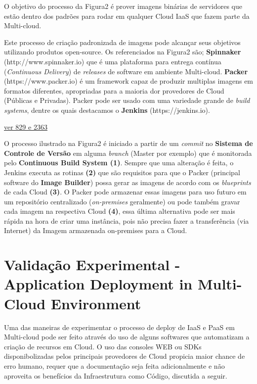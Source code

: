 \documentclass[12pt]{article}
\begin{document}
	O objetivo do processo da Figura2 é prover imagens binárias de servidores que estão dentro dos padrões para rodar em qualquer Cloud IaaS que fazem parte da Multi-cloud.
	
	Este processo de criação padronizada de imagens pode alcançar seus objetivos utilizando produtos open-source. Os referenciados na Figura2 são; \textbf{Spinnaker} (http://www.spinnaker.io) que é uma plataforma para entrega contínua (\textit{Continuous Delivery}) de \textit{releases} de software em ambiente Multi-cloud. \textbf{Packer} (https://www.packer.io) é um framework capaz de produzir multiplas imagens em formatos diferentes, apropriadas para a maioria dor provedores de Cloud (Públicas e Privadas). Packer pode ser usado com uma variedade grande de \textit{build systems}, dentre os quais destacamos o \textbf{Jenkins} (https://jenkins.io).
	
	\underline{ver 829 e 2363}

	O processo ilustrado na Figura2 é iniciado a partir de um \textit{commit} no \textbf{Sistema de Controle de Versão} em alguma \textit{branch} (Master por exemplo) que é monitorada pelo \textbf{Continuous Build System (1)}. Sempre que uma alteração é feita, o Jenkins executa as rotinas \textbf{(2)} que são requisitos para que o Packer (principal software do \textbf{Image Builder}) possa gerar as imagens de acordo com os \textit{blueprints} de cada Cloud \textbf{(3)}. O Packer pode armazenar essas imagens para uso futuro em um repositório centralizado (\textit{on-premises} geralmente) ou pode também gravar cada imagem na respectiva Cloud \textbf{(4)}, essa última alternativa pode ser mais rápida na hora de criar uma instância, pois não precisa fazer a transferência (via Internet) da Imagem armazenada on-premises para a Cloud.
	
	\section{Validação Experimental - Application Deployment in Multi-Cloud Environment}
	
	Uma das maneiras de experimentar o processo de deploy de IaaS e PaaS em Multi-cloud pode ser feito através do uso de alguns softwares que automatizam a criação de recursos em Cloud. O uso das consoles WEB ou SDKs disponibolizadas pelos principais provedores de Cloud propicia maior chance de erro humano, requer que a documentação seja feita adicionalmente e não aproveita os benefícios da Infraestrutura como Código, discutida a seguir.  
	
\end{document}
